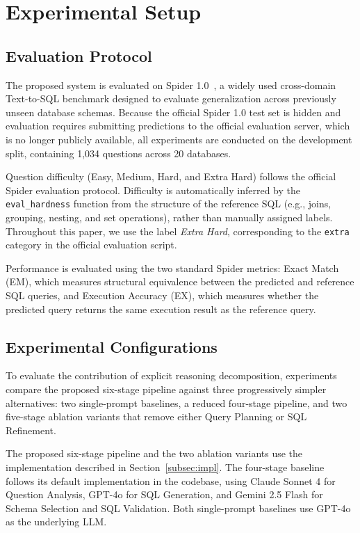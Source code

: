 \documentclass{svproc}
\begin{document}
\section{Experimental Setup}
\label{sec:exp}


\subsection{Evaluation Protocol}
\label{subsec:data}

The proposed system is evaluated on Spider 1.0~\cite{yu2018spider}, a widely used cross-domain Text-to-SQL benchmark designed to evaluate generalization across previously unseen database schemas. Because the official Spider 1.0 test set is hidden and evaluation requires submitting predictions to the official evaluation server, which is no longer publicly available, all experiments are conducted on the development split, containing 1,034 questions across 20 databases.

Question difficulty (Easy, Medium, Hard, and Extra Hard) follows the official Spider evaluation protocol. Difficulty is automatically inferred by the \texttt{eval\_hardness} function from the structure of the reference SQL (e.g., joins, grouping, nesting, and set operations), rather than manually assigned labels. Throughout this paper, we use the label \textit{Extra Hard}, corresponding to the \texttt{extra} category in the official evaluation script.

Performance is evaluated using the two standard Spider metrics: Exact Match (EM), which measures structural equivalence between the predicted and reference SQL queries, and Execution Accuracy (EX), which measures whether the predicted query returns the same execution result as the reference query.

\subsection{Experimental Configurations}
\label{subsec:configs}

To evaluate the contribution of explicit reasoning decomposition, experiments compare the proposed six-stage pipeline against three progressively simpler alternatives: two single-prompt baselines, a reduced four-stage pipeline, and two five-stage ablation variants that remove either Query Planning or SQL Refinement.

The proposed six-stage pipeline and the two ablation variants use the implementation described in Section~\ref{subsec:impl}. The four-stage baseline follows its default implementation in the codebase, using Claude Sonnet 4 for Question Analysis, GPT-4o for SQL Generation, and Gemini 2.5 Flash for Schema Selection and SQL Validation. Both single-prompt baselines use GPT-4o as the underlying LLM.
\end{document}
